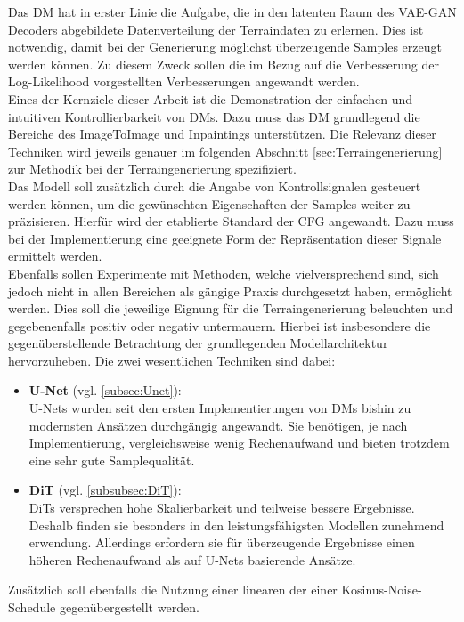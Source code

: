 Das \ac{DM} hat in erster Linie die Aufgabe, die in den latenten Raum des VAE-GAN Decoders abgebildete Datenverteilung der Terraindaten zu erlernen.  Dies ist notwendig, damit bei der Generierung möglichst überzeugende Samples erzeugt werden können. Zu diesem Zweck sollen die im Bezug auf die Verbesserung der Log-Likelihood vorgestellten Verbesserungen angewandt werden. \\
Eines der Kernziele dieser Arbeit ist die Demonstration der einfachen und intuitiven Kontrollierbarkeit von \ac{DM}s. Dazu muss das \ac{DM} grundlegend die Bereiche des ImageToImage und Inpaintings unterstützen. Die Relevanz dieser Techniken wird jeweils genauer im folgenden Abschnitt \ref{sec:Terraingenerierung} zur Methodik bei der Terraingenerierung spezifiziert. \\
Das Modell soll zusätzlich durch die Angabe von Kontrollsignalen gesteuert werden können, um die gewünschten Eigenschaften der Samples weiter zu präzisieren. Hierfür wird der etablierte Standard der \ac{CFG} angewandt. Dazu muss bei der Implementierung eine geeignete Form der Repräsentation dieser Signale ermittelt werden. \\
Ebenfalls sollen Experimente mit Methoden, welche vielversprechend sind, sich jedoch nicht in allen Bereichen als gängige Praxis durchgesetzt haben, ermöglicht werden. Dies soll die jeweilige Eignung für die Terraingenerierung beleuchten und gegebenenfalls positiv oder negativ untermauern. Hierbei ist insbesondere die gegenüberstellende Betrachtung der grundlegenden Modellarchitektur hervorzuheben. Die zwei wesentlichen Techniken sind dabei:  
\begin{itemize}
    \item \textbf{U-Net} (vgl. \ref{subsec:Unet}): \\
    U-Nets wurden seit den ersten Implementierungen von \ac{DM}s bishin zu modernsten Ansätzen durchgängig angewandt. Sie benötigen, je nach Implementierung, vergleichsweise wenig Rechenaufwand und bieten trotzdem eine sehr gute Samplequalität. 
    \item \textbf{DiT} (vgl. \ref{subsubsec:DiT}): \\
    \ac{DiT}s versprechen hohe Skalierbarkeit und teilweise bessere Ergebnisse. Deshalb finden sie besonders in den leistungsfähigsten Modellen zunehmend erwendung. Allerdings erfordern sie für überzeugende Ergebnisse einen höheren Rechenaufwand als auf U-Nets basierende Ansätze. 
\end{itemize}
Zusätzlich soll ebenfalls die Nutzung einer linearen der einer Kosinus-Noise-Schedule gegenübergestellt werden. 


